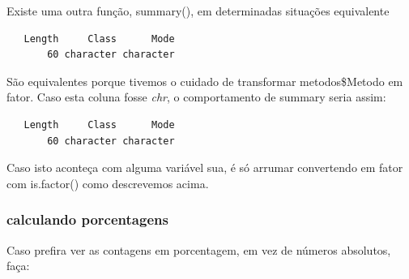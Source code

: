 \documentclass[
]{article}
\newenvironment{Shaded}{\begin{snugshade}}{\end{snugshade}}
\newcommand{\DecValTok}[1]{\textcolor[rgb]{0.00,0.00,0.81}{#1}}
\newcommand{\FunctionTok}[1]{\textcolor[rgb]{0.00,0.00,0.00}{#1}}
\newcommand{\NormalTok}[1]{#1}
\newcommand{\OtherTok}[1]{\textcolor[rgb]{0.56,0.35,0.01}{#1}}
\newcommand{\SpecialCharTok}[1]{\textcolor[rgb]{0.00,0.00,0.00}{#1}}
\begin{document}
Existe uma outra função, summary(), em determinadas situações
equivalente

\begin{Shaded}
\end{Shaded}

\begin{verbatim}
   Length     Class      Mode 
       60 character character 
\end{verbatim}

São equivalentes porque tivemos o cuidado de transformar metodos\$Metodo
em fator. Caso esta coluna fosse \emph{chr}, o comportamento de summary
seria assim:

\begin{Shaded}
\end{Shaded}

\begin{verbatim}
   Length     Class      Mode 
       60 character character 
\end{verbatim}

Caso isto aconteça com alguma variável sua, é só arrumar convertendo em
fator com is.factor() como descrevemos acima.

\hypertarget{calculando-porcentagens}{%
\subsubsection{calculando porcentagens}\label{calculando-porcentagens}}

Caso prefira ver as contagens em porcentagem, em vez de números
absolutos, faça:

\begin{Shaded}
\end{Shaded}
\end{document}
